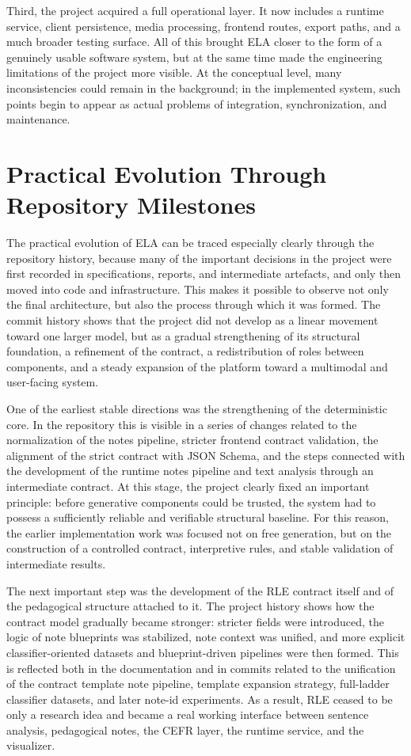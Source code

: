 \documentclass[12pt,a4paper,oneside]{report}
\begin{document}
Third, the project acquired a full operational layer. It now includes a runtime service, client persistence, media processing, frontend routes, export paths, and a much broader testing surface. All of this brought ELA closer to the form of a genuinely usable software system, but at the same time made the engineering limitations of the project more visible. At the conceptual level, many inconsistencies could remain in the background; in the implemented system, such points begin to appear as actual problems of integration, synchronization, and maintenance.

\section{Practical Evolution Through Repository Milestones}
The practical evolution of ELA can be traced especially clearly through the repository history, because many of the important decisions in the project were first recorded in specifications, reports, and intermediate artefacts, and only then moved into code and infrastructure. This makes it possible to observe not only the final architecture, but also the process through which it was formed. The commit history shows that the project did not develop as a linear movement toward one larger model, but as a gradual strengthening of its structural foundation, a refinement of the contract, a redistribution of roles between components, and a steady expansion of the platform toward a multimodal and user-facing system.

One of the earliest stable directions was the strengthening of the deterministic core. In the repository this is visible in a series of changes related to the normalization of the notes pipeline, stricter frontend contract validation, the alignment of the strict contract with JSON Schema, and the steps connected with the development of the runtime notes pipeline and text analysis through an intermediate contract. At this stage, the project clearly fixed an important principle: before generative components could be trusted, the system had to possess a sufficiently reliable and verifiable structural baseline. For this reason, the earlier implementation work was focused not on free generation, but on the construction of a controlled contract, interpretive rules, and stable validation of intermediate results.

The next important step was the development of the RLE contract itself and of the pedagogical structure attached to it. The project history shows how the contract model gradually became stronger: stricter fields were introduced, the logic of note blueprints was stabilized, note context was unified, and more explicit classifier-oriented datasets and blueprint-driven pipelines were then formed. This is reflected both in the documentation and in commits related to the unification of the contract template note pipeline, template expansion strategy, full-ladder classifier datasets, and later note-id experiments. As a result, RLE ceased to be only a research idea and became a real working interface between sentence analysis, pedagogical notes, the CEFR layer, the runtime service, and the visualizer.
\end{document}
